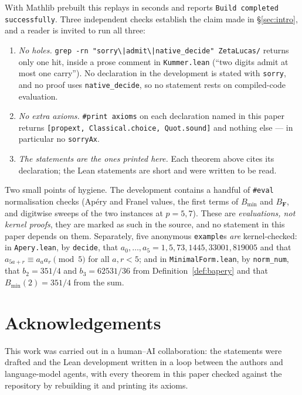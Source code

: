 \documentclass[11pt,reqno]{amsart}
\theoremstyle{plain}
\theoremstyle{definition}
\theoremstyle{remark}
\newcommand{\Ln}[1]{\texttt{#1}}
\numberwithin{equation}{section}
\begin{document}
\noindent
With Mathlib prebuilt this replays in seconds and reports
\Ln{Build completed successfully}. Three independent checks establish the claim made in
\S\ref{sec:intro}, and a reader is invited to run all three:

\begin{enumerate}[leftmargin=1.9em,label=\textup{(\arabic*)}]
\item \emph{No holes.} \Ln{grep -rn "sorry\textbackslash|admit\textbackslash|native\_decide"
  ZetaLucas/} returns only one hit, inside a prose comment in \Ln{Kummer.lean}
  (``two digits admit at most one carry''). No declaration in the development is stated with
  \Ln{sorry}, and no proof uses \Ln{native\_decide}, so no statement rests on compiled-code
  evaluation.
\item \emph{No extra axioms.} \Ln{\#print axioms} on each declaration named in this paper
  returns \Ln{[propext, Classical.choice, Quot.sound]} and nothing else --- in particular no
  \Ln{sorryAx}.
\item \emph{The statements are the ones printed here.} Each theorem above cites its
  declaration; the Lean statements are short and were written to be read.
\end{enumerate}

Two small points of hygiene. The development contains a handful of \Ln{\#eval} normalisation
checks (Ap\'ery and Franel values, the first terms of $B_{\min}$ and $B_{\mathbf F}$, and
digitwise sweeps of the two instances at $p=5,7$). These are \emph{evaluations, not kernel
proofs}, they are marked as such in the source, and no statement in this paper depends on
them. Separately, five anonymous \Ln{example}s \emph{are} kernel-checked: in \Ln{Apery.lean},
by \Ln{decide}, that $a_0,\dots,a_5=1,5,73,1445,33001,819005$ and that
$a_{5a+r}\equiv a_aa_r\pmod5$ for all $a,r<5$; and in \Ln{MinimalForm.lean}, by
\Ln{norm\_num}, that $b_2=351/4$ and $b_3=62531/36$ from Definition~\ref{def:bapery} and that
$B_{\min}(2)=351/4$ from the sum.

\section*{Acknowledgements}

This work was carried out in a human--AI collaboration: the statements were drafted and the
Lean development written in a loop between the authors and language-model agents, with every
theorem in this paper checked against the repository by rebuilding it and printing its
axioms.
\end{document}
